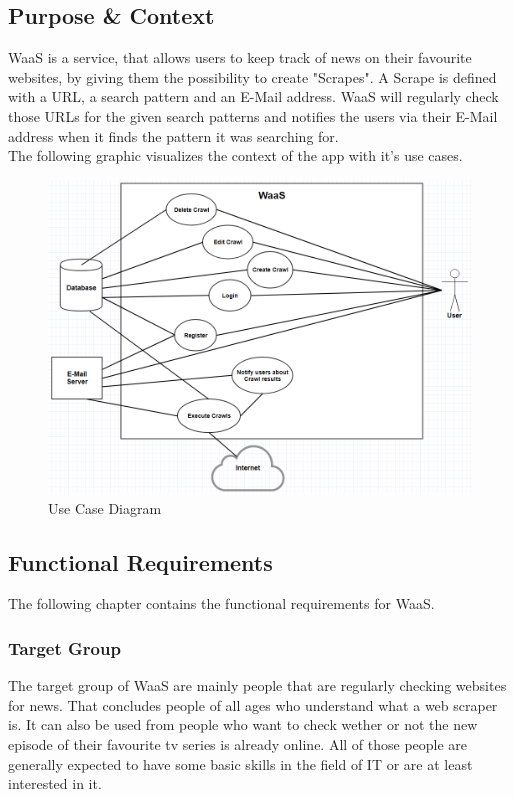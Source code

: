 \documentclass[titlepage, 12pt]{article}
\begin{document}
\subsection{Purpose \& Context}

WaaS is a service, that allows users to keep track of news on their favourite websites, by giving them the possibility to create "Scrapes". A Scrape is defined with a URL, a search pattern and an E-Mail address. WaaS will regularly check those URLs for the given search patterns and notifies the users via their E-Mail address when it finds the pattern it was searching for.
\medskip \\
The following graphic visualizes the context of the app with it's use cases.

\begin{figure}[H]
  \includegraphics[width=0.95\linewidth]{UseCaseDiagram.PNG}
  \caption{Use Case Diagram}
  \label{fig:useCaseDiagram}
\end{figure}

\subsection{Functional Requirements}

The following chapter contains the functional requirements for WaaS.

\subsubsection{Target Group}

The target group of WaaS are mainly people that are regularly checking websites for news. That concludes people of all ages who understand what a web scraper is. It can also be used from people who want to check wether or not the new episode of their favourite tv series is already online. All of those people are generally expected to have some basic skills in the field of IT or are at least interested in it.
\end{document}
